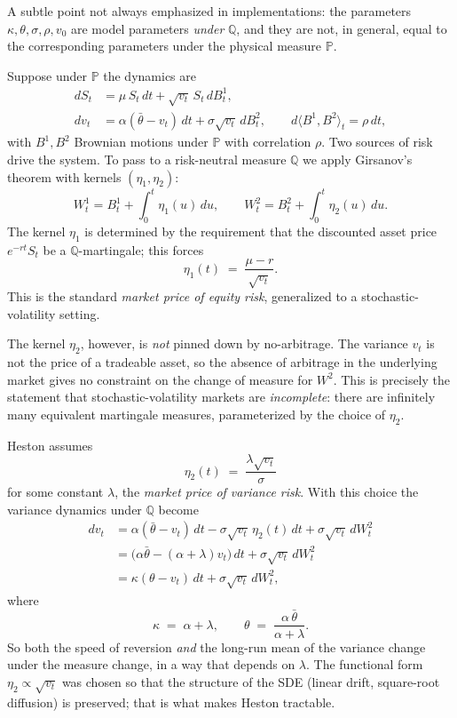 \documentclass[11pt]{article}
\theoremstyle{plain}
\theoremstyle{definition}
\theoremstyle{remark}
\begin{document}
A subtle point not always emphasized in implementations: the parameters \(\kappa, \theta, \sigma, \rho, v_0\) are model parameters \emph{under} \(\mathbb{Q}\), and they are not, in general, equal to the corresponding parameters under the physical measure \(\mathbb{P}\).

Suppose under \(\mathbb{P}\) the dynamics are
\begin{align*}
    dS_t &= \mu\,S_t\,dt + \sqrt{v_t}\,S_t\,dB^1_t, \\
    dv_t &= \alpha(\bar{\theta} - v_t)\,dt + \sigma\sqrt{v_t}\,dB^2_t, \qquad d\langle B^1, B^2\rangle_t = \rho\,dt,
\end{align*}
with \(B^1, B^2\) Brownian motions under \(\mathbb{P}\) with correlation \(\rho\). Two sources of risk drive the system. To pass to a risk-neutral measure \(\mathbb{Q}\) we apply Girsanov's theorem with kernels \((\eta_1, \eta_2)\):
\[
    W^1_t = B^1_t + \int_0^t \eta_1(u)\,du, \qquad W^2_t = B^2_t + \int_0^t \eta_2(u)\,du.
\]
The kernel \(\eta_1\) is determined by the requirement that the discounted asset price \(e^{-rt}S_t\) be a \(\mathbb{Q}\)-martingale; this forces
\[
    \eta_1(t) \;=\; \frac{\mu - r}{\sqrt{v_t}}.
\]
This is the standard \emph{market price of equity risk}, generalized to a stochastic-volatility setting.

The kernel \(\eta_2\), however, is \emph{not} pinned down by no-arbitrage. The variance \(v_t\) is not the price of a tradeable asset, so the absence of arbitrage in the underlying market gives no constraint on the change of measure for \(W^2\). This is precisely the statement that stochastic-volatility markets are \emph{incomplete}: there are infinitely many equivalent martingale measures, parameterized by the choice of \(\eta_2\).

Heston \cite{Heston1993} assumes
\[
    \eta_2(t) \;=\; \frac{\lambda\sqrt{v_t}}{\sigma}
\]
for some constant \(\lambda\), the \emph{market price of variance risk}. With this choice the variance dynamics under \(\mathbb{Q}\) become
\begin{align*}
    dv_t &= \alpha(\bar{\theta} - v_t)\,dt - \sigma\sqrt{v_t}\,\eta_2(t)\,dt + \sigma\sqrt{v_t}\,dW^2_t \\
        &= \bigl(\alpha\bar{\theta} - (\alpha + \lambda)v_t\bigr)\,dt + \sigma\sqrt{v_t}\,dW^2_t \\
        &= \kappa(\theta - v_t)\,dt + \sigma\sqrt{v_t}\,dW^2_t,
\end{align*}
where
\[
    \kappa \;=\; \alpha + \lambda, \qquad \theta \;=\; \frac{\alpha\,\bar{\theta}}{\alpha + \lambda}.
\]
So both the speed of reversion \emph{and} the long-run mean of the variance change under the measure change, in a way that depends on \(\lambda\). The functional form \(\eta_2 \propto \sqrt{v_t}\) was chosen so that the structure of the SDE (linear drift, square-root diffusion) is preserved; that is what makes Heston tractable.
\end{document}
